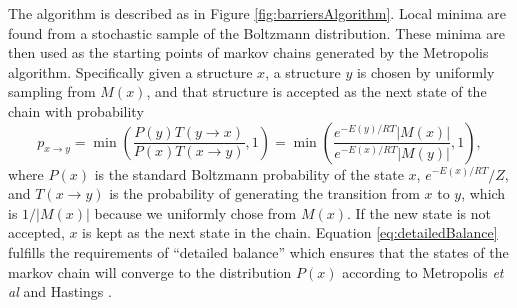 The algorithm is described as in Figure
\ref{fig:barriersAlgorithm}. Local minima are found from a stochastic
sample of the Boltzmann distribution. These minima are then used as
the starting points of markov chains generated by the Metropolis
algorithm. Specifically given a structure $x$, a structure $y$ is
chosen by uniformly sampling from $M(x)$, and that structure is
accepted as the next state of the chain with probability 
\begin{equation}
p_{x\to y} = \min \left ( \frac{ P(y) T(y \to x)}{ P(x) T(x \to y)} , 1 \right ) =  \min \left ( \frac{ e^{-E(y)/RT}  | M(x) |}{ e^{-E(x)/RT} | M(y) |} , 1 \right ),
\label{eq:detailedBalance}
\end{equation}
where $P(x)$ is the standard Boltzmann probability of the state $x$,
$e^{-E(x)/RT}/Z$, and $T(x \to y)$ is the probability of generating
the transition from $x$ to $y$, which is $1/|M(x)|$ because we
uniformly chose from $M(x)$. If the new state is not accepted, $x$ is
kept as the next state in the chain. Equation \ref{eq:detailedBalance}
fulfills the requirements of ``detailed balance'' which ensures that
the states of the markov chain will converge to the distribution
$P(x)$ according to Metropolis \emph{et al} and Hastings
\cite{metropolis1953equation} \cite{hastings1970monte}. 

